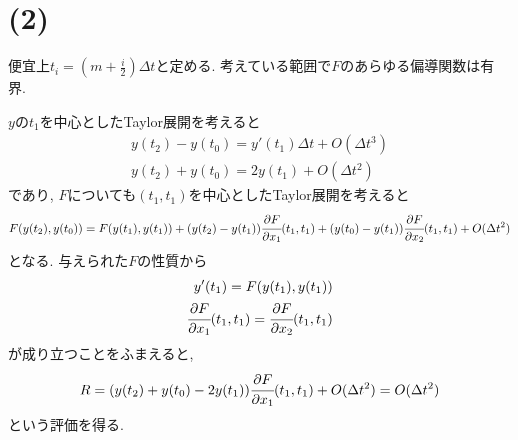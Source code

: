 \documentclass[uplatex,dvipdfmx]{jsarticle}
\begin{document}
  \section*{(2)}
  便宜上$t_i = (m + \frac{i}{2})\Delta t $と定める.
  考えている範囲で$F$のあらゆる偏導関数は有界.

  $y$の$t_1$を中心としたTaylor展開を考えると
  \begin{eqnarray*}
    y(t_2)-y(t_0)=y'(t_1)\Delta t + O(\Delta t^3)\\
    y(t_2)+y(t_0)=2y(t_1) + O(\Delta t^2)
  \end{eqnarray*}
であり, $F$についても$(t_1, t_1)$を中心としたTaylor展開を考えると
\begin{equation*}
  F(y(t_2), y(t_0))=F(y(t_1), y(t_1))
  +(y(t_2)-y(t_1))\cfrac{\partial F}{\partial x_1}(t_1,t_1)
  +(y(t_0)-y(t_1))\cfrac{\partial F}{\partial x_2}(t_1,t_1)
  +O(\Delta t^2)
\end{equation*}
となる. 与えられた$F$の性質から
\begin{eqnarray*}
  y'(t_1) = F(y(t_1), y(t_1))\\
  \cfrac{\partial F}{\partial x_1}(t_1,t_1) = \cfrac{\partial F}{\partial x_2}(t_1,t_1)
\end{eqnarray*}
が成り立つことをふまえると,
\begin{eqnarray*}
R = (y(t_2)+y(t_0)-2y(t_1))\cfrac{\partial F}{\partial x_1}(t_1,t_1)+O(\Delta t^2)
=O(\Delta t^2)
\end{eqnarray*}
という評価を得る.
\end{document}
